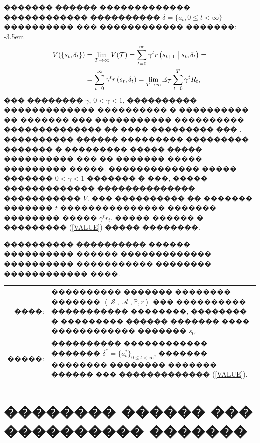 \documentclass[11pt]{ubs}
\DeclareMathOperator{\state}{\mathcal{S}}
\DeclareMathOperator{\action}{\mathcal{A}}
\begin{document}
  {
    ������� ������ ������������� ������������ ���������� $\delta= \{a_t, 0\leq t<\infty\}$ ���������� ��� ������������ �������:
    \abovedisplayskip = -3.5em
    \begin{equation}\label{VALUE}
      \begin{split}
        V( \left\{s_t, \delta_t\right\}) & = \lim\limits_{T\to\infty}V( {\cal T})  = \sum_{t=0}^{\infty}\gamma^t r\left( s_{t+1} \bigm| s_t,\delta_t\right) = \\
                                         & = \sum_{t=0}^{\infty}\gamma^t r\left( s_t,\delta_t\right)
        = \lim\limits_{T\to\infty}\mathbb{E}_{{\cal T}} \sum_{t=0}^{T}\gamma^t R_t,
      \end{split}
    \end{equation}
  }\noindent
���  �������� $\gamma$, $0 < \gamma < 1$, ���������� ������������� ���������� � ���������� �� ������� ��� ����������� ���������� �������������� �� ���� ��������� ��� \cite{Ivanov}. 
���������� ������ ��������� ��������� ������� � ��������� ����� ����� ���������� ��� �� ������� ����� ��������� �����. ������������� ����� ������� $0 < \gamma < 1$ ������� � ���, 
����� ������������� �������������� ����������� $V.$
��� ���������� �� ������� ������� $t$ ��������������� ������� �������� ����� $\gamma^t r_t.$ ����� ������ � ��������� (\ref{VALUE}) ����� ��������.


���������� ����������  ������ ���������� ������ ������������� ���������� ����������� �������� ������������ ����.
\begin{center}
  \begin{tabular}{rl}
    {\sf ����}:
     &
    \parbox[t]{0.84\textwidth}{���������� ������� �������� ������� $\left\langle  \state, \action, \mathbb{P}, r \right\rangle$ ���  ���������� ����������� ��������, ��������  � ��������� ������ ������� ���� ������������ ������� $s_0$.}
    \\
    {\sf  �����}:
     &
    \parbox[t]{0.84\textwidth}{
    ����������  ������������  ������� $\delta^*=\{ a^*_t\}_{0\leq t<\infty}$,\;\;\;\;  �������  �������� �������� ������� ������ ���\;\;\;\;\;\;\;\;  ������������� (\ref{VALUE}).
    }
  \end{tabular}
\end{center}


\section{�������� ������ ��� ���������� �������}
\label{par:MARL_many_description}
\end{document}
